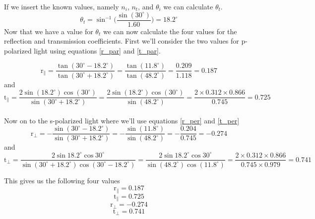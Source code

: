 	If we insert the known values, namely $n_i$, $n_t$, and $\theta_i$ we can calculate $\theta_t$.
	\begin{equation*}
		\theta_t = \sin^{-1}\Big(\dfrac{\sin (30^\circ)}{1.60}\Big) = 18.2^\circ
	\end{equation*}
	Now that we have a value for $\theta_t$ we can now calculate the four values for the reflection and transmission coefficients. First we'll 
	consider the two values for p-polarized light using equations \ref{r_par} and \ref{t_par}. 
	
	\begin{equation*}
		\mathrm{r}_\parallel = \dfrac{\tan (30^\circ - 18.2^\circ)}{\tan (30^\circ + 18.2^\circ)} = 
		\dfrac{\tan (11.8^\circ)}{\tan (48.2^\circ)} = \dfrac{0.209}{1.118} = 0.187
	\end{equation*}
	and
	\begin{equation*}
		\mathrm{t}_\parallel = \dfrac{2\sin(18.2^\circ)\cos(30^\circ)}{\sin(30^\circ + 18.2^\circ)} =
		\dfrac{2\sin(18.2^\circ)\cos(30^\circ)}{\sin(48.2^\circ)} = \dfrac{2 \times 0.312 \times 0.866}{0.745} = 0.725 
	\end{equation*}
	\\
	Now on to the s-polarized light where we'll use equations \ref{r_per} and \ref{t_per}
	\begin{equation*}
		\mathrm{r}_\bot = -\dfrac{\sin (30^\circ - 18.2^\circ)}{\sin (30^\circ + 18.2^\circ)} = 
		-\dfrac{\sin (11.8^\circ)}{\sin (48.2^\circ)} = -\dfrac{0.204}{0.745} = -0.274 
	\end{equation*}
	and
	\begin{equation*}
		\mathrm{t}_\bot = \dfrac{2\sin18.2^\circ\cos30^\circ}{\sin(30^\circ + 18.2^\circ)\cos(30^\circ - 18.2^\circ)} = 
		\dfrac{2\sin18.2^\circ\cos30^\circ}{\sin(48.2^\circ)\cos(11.8^\circ)} = 
		\dfrac{2 \times 0.312 \times 0.866}{0.745 \times 0.979} = 0.741
	\end{equation*}
	
	This gives us the following four values
	$$ \mathrm{r}_\parallel = 0.187 $$
	$$ \mathrm{t}_\parallel = 0.725 $$
	$$ \mathrm{r}_\bot = -0.274 $$
	$$ \mathrm{t}_\bot = 0.741 $$
